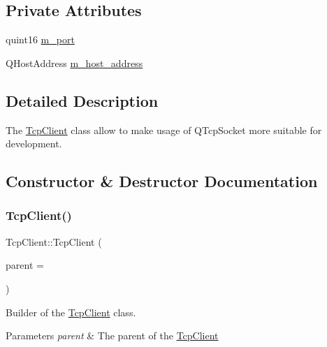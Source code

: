 \subsection*{Private Attributes}
\begin{DoxyCompactItemize}
\item 
quint16 \mbox{\hyperlink{class_tcp_client_a9c8dbdd8d4571d37bc774d17b627c2d5}{m\+\_\+port}}
\item 
Q\+Host\+Address \mbox{\hyperlink{class_tcp_client_acf0e0d339a1160852fd2ed2eaf4dce7f}{m\+\_\+host\+\_\+address}}
\end{DoxyCompactItemize}


\subsection{Detailed Description}
The \mbox{\hyperlink{class_tcp_client}{Tcp\+Client}} class allow to make usage of Q\+Tcp\+Socket more suitable for development. 

\subsection{Constructor \& Destructor Documentation}
\mbox{\label{class_tcp_client_adde22f7475a79d89eca8107fd9223405}} 
\subsubsection{\texorpdfstring{TcpClient()}{TcpClient()}\hspace{0.1cm}{\footnotesize\ttfamily [1/2]}}
{\footnotesize\ttfamily Tcp\+Client\+::\+Tcp\+Client (\begin{DoxyParamCaption}\item[{Q\+Tcp\+Socket $\ast$}]{parent = {} }\end{DoxyParamCaption})}



Builder of the \mbox{\hyperlink{class_tcp_client}{Tcp\+Client}} class. 


\begin{DoxyParams}{Parameters}
{\em parent} & The parent of the \mbox{\hyperlink{class_tcp_client}{Tcp\+Client}} \\
\hline
\end{DoxyParams}
\mbox{\label{class_tcp_client_a27a11b182cec604367594ae040e042a8}} 
